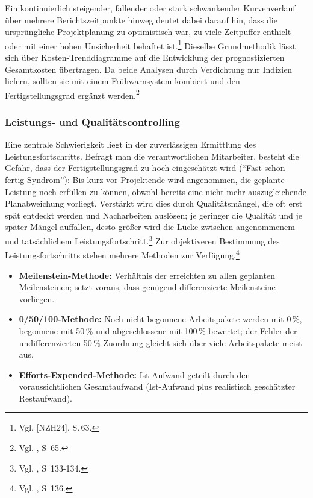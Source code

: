 \documentclass[
    12pt, 
    a4paper,
    ]{scrartcl} %
\begin{document}
Ein kontinuierlich steigender, fallender oder stark schwankender Kurvenverlauf über mehrere Berichtszeitpunkte hinweg deutet dabei darauf hin, dass die ursprüngliche Projektplanung zu optimistisch war, zu viele Zeitpuffer enthielt oder mit einer hohen Unsicherheit behaftet ist.\footnote{Vgl. [NZH24], S.\,63.} Dieselbe Grundmethodik lässt sich über Kosten-Trenddiagramme auf die Entwicklung der prognostizierten Gesamtkosten übertragen. Da beide Analysen durch Verdichtung nur Indizien liefern, sollten sie mit einem Frühwarnsystem kombiert und den Fertigstellungsgrad ergänzt werden.\footnote{Vgl. \cite{Nobach_Projektcontrolling}, S~65.}

\subsubsection{Leistungs- und Qualitätscontrolling}
Eine zentrale Schwierigkeit liegt in der zuverlässigen Ermittlung des Leistungsfortschritts. Befragt man die verantwortlichen Mitarbeiter, besteht die Gefahr, dass der Fertigstellungsgrad zu hoch eingeschätzt wird (\enquote{Fast-schon-fertig-Syndrom}): Bis kurz vor Projektende wird angenommen, die geplante Leistung noch erfüllen zu können, obwohl bereits eine nicht mehr auszugleichende Planabweichung vorliegt. Verstärkt wird dies durch Qualitätsmängel, die oft erst spät entdeckt werden und Nacharbeiten auslösen; je geringer die Qualität und je später Mängel auffallen, desto größer wird die Lücke zwischen angenommenem und tatsächlichem Leistungsfortschritt.\footnote{Vgl. \cite{Feidler_ControllingVonProjekten}, S~133-134.}
Zur objektiveren Bestimmung des Leistungsfortschritts stehen mehrere Methoden zur Verfügung.\footnote{Vgl. \cite{Feidler_ControllingVonProjekten}, S~136.}
\begin{itemize}
    \setlength\itemsep{0.4\baselineskip}
    \setlength\parskip{0pt}
    \setlength\parsep{0pt}
    \item \textbf{Meilenstein-Methode:} Verhältnis der erreichten zu allen geplanten Meilensteinen; setzt voraus, dass genügend differenzierte Meilensteine vorliegen.
    \item \textbf{0/50/100-Methode:} Noch nicht begonnene Arbeitspakete werden mit 0\,\%, begonnene mit 50\,\% und abgeschlossene mit 100\,\% bewertet; der Fehler der undifferenzierten 50\,\%-Zuordnung gleicht sich über viele Arbeitspakete meist aus.
    \item \textbf{Efforts-Expended-Methode:} Ist-Aufwand geteilt durch den voraussichtlichen Gesamtaufwand (Ist-Aufwand plus realistisch geschätzter Restaufwand).
\end{itemize}
\end{document}
